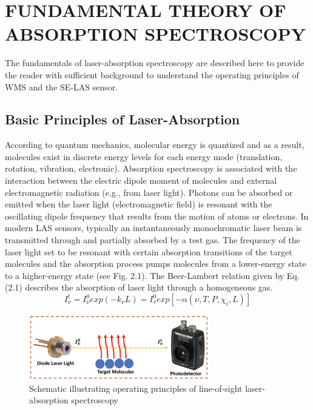 \chapter{FUNDAMENTAL THEORY OF ABSORPTION SPECTROSCOPY}
The fundamentals of laser-absorption spectroscopy are described here to provide the reader with sufficient background to understand the operating principles of WMS and the SE-LAS sensor.

\section{Basic Principles of Laser-Absorption}
According to quantum mechanics, molecular energy is quantized and as a result, molecules exist in discrete energy levels for each energy mode (translation, rotation, vibration, electronic). Absorption spectroscopy is associated with the interaction between the electric dipole moment of molecules and external electromagnetic radiation (e.g., from laser light).  Photons can be absorbed or emitted when the laser light (electromagnetic field) is resonant with the oscillating dipole frequency that results from the motion of atoms or electrons. In modern LAS sensors, typically an instantaneously monochromatic laser beam is transmitted through and partially absorbed by a test gas. The frequency of the laser light set to be resonant with certain absorption transitions of the target molecules and the absorption process pumps molecules from a lower-energy state to a higher-energy state (see Fig. 2.1). The Beer-Lambert relation given by Eq. (2.1) describes the absorption of laser light through a homogeneous gas.
\begin{equation}\label{}
I_\nu^t=I_\nu^0exp(-{k_\nu}L)=I_v^0exp[-\alpha(\nu,T,P,\chi_i,L)]
\end{equation}

\begin{figure}[ht]
    \centering
        \includegraphics[width=0.7\textwidth]{fig/ch2_fig1_v2.png}
        \caption{Schematic illustrating operating principles of line-of-sight laser-absorption spectroscopy}
    \label{fig:ch2_1}
\end{figure}

